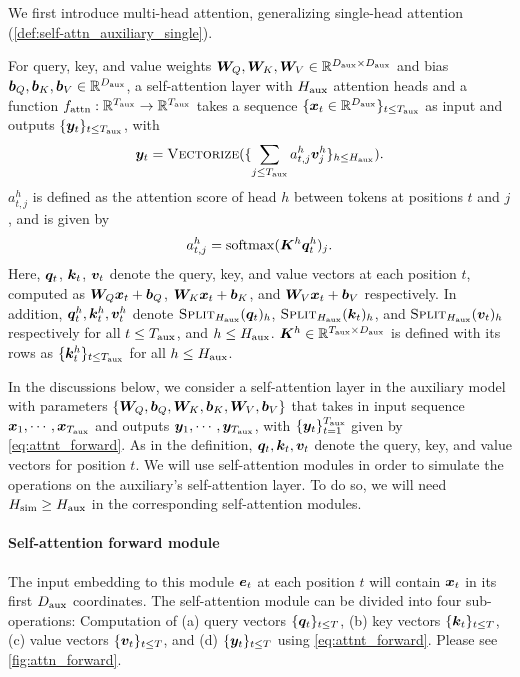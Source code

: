 We first introduce multi-head attention,  generalizing  single-head attention (\cref{def:self-attn_auxiliary_single}). 
\begin{definition}\label{def:self-attn}
    For query, key, and value weights ${\bm{W}}_Q, {\bm{W}}_K, {\bm{W}}_V \in\mathbb{R}^{D_{\text{aux}}\times D_{\text{aux}}}$ and bias ${\bm{b}}_{Q}, {\bm{b}}_{K}, {\bm{b}}_{V} \in\mathbb{R}^{D_{\text{aux}}}$, a self-attention layer with $H_{\text{aux}}$ attention heads and a function $f_{\mathrm{attn}}: \mathbb{R}^{T_{\text{aux}}} \to \mathbb{R}^{T_{\text{aux}}}$ takes a sequence $\{{\bm{x}}_t\in\mathbb{R}^{D_{\text{aux}}}\}_{t \le T_{\text{aux}}}$ as input and outputs $\{ {\bm{y}}_t \}_{t \le T_{\text{aux}}}$, with 
    \begin{align}
        {\bm{y}}_t = \textsc{Vectorize} ( \{ \sum_{j \le T_{\text{aux}}} a^h_{t, j}  {\bm{v}}^{h}_j  \}_{h \le H_{\text{aux}}} ).  \label{eq:attnt_forward}
    \end{align}
    $a^{h}_{t, j}$ is defined as the attention score of head $h$ between tokens at positions $t$ and $j$, and is given by
    \begin{align} \label{eq:attn}
        a^h_{t, j} =  \mathrm{softmax} ( {\bm{K}}^{h} {\bm{q}}^{h}_t )_j.
    \end{align}
     Here, ${\bm{q}}_t$, ${\bm{k}}_t$, ${\bm{v}}_t$ denote the query, key, and value vectors at each position $t$, computed as ${\bm{W}}_Q {\bm{x}}_t + {\bm{b}}_Q$, ${\bm{W}}_K {\bm{x}}_t + {\bm{b}}_K$, and ${\bm{W}}_V {\bm{x}}_t + {\bm{b}}_V$ respectively. In addition, ${\bm{q}}^{h}_t, {\bm{k}}^{h}_t, {\bm{v}}^{h}_t$ denote $\textsc{Split}_{H_{\text{aux}}} ({\bm{q}}_t)_h$, $\textsc{Split}_{H_{\text{aux}}} ({\bm{k}}_t)_h$, and $\textsc{Split}_{H_{\text{aux}}} ({\bm{v}}_t)_h$ respectively for all $t \le T_{\text{aux}}$, and $h \le H_{\text{aux}}$. 
     ${\bm{K}}^h \in \mathbb{R}^{T_{\text{aux}} \times D_{\text{aux}} }$ is defined with its rows as $\{{\bm{k}}^h_t\}_{t \le T_{\text{aux}}}$ for all $h \le H_{\text{aux}}$.
\end{definition}


In the discussions below, we consider a self-attention layer in the auxiliary model with parameters $\{{\bm{W}}_Q, {\bm{b}}_{Q}, {\bm{W}}_K, {\bm{b}}_K, {\bm{W}}_V, {\bm{b}}_{V}\}$ that takes in input sequence ${\bm{x}}_1, \cdots, {\bm{x}}_{T_{\text{aux}}}$ and outputs ${\bm{y}}_1, \cdots, {\bm{y}}_{T_{\text{aux}}}$, with $\{ {\bm{y}}_t \}_{t=1}^{T_{\text{aux}}}$ given by \eqref{eq:attnt_forward}. As in the definition,  ${\bm{q}}_t, {\bm{k}}_t, {\bm{v}}_t$ denote the query, key, and value vectors for position $t$. We will use \simulator{} self-attention modules in order to simulate the operations on the auxiliary's self-attention layer. To do so, we will need $H_{\text{sim}} \ge H_{\text{aux}}$ in the corresponding \simulator{} self-attention modules.



\paragraph{\simulator{} Self-attention forward module}
The input embedding to this  module $\ve_t$ at each position $t$ will contain ${\bm{x}}_t$ in its first $D_{\text{aux}}$ coordinates. The self-attention module can be divided into four sub-operations: Computation of (a)  query vectors $\{ {\bm{q}}_t \}_{t \le T}$, (b)  key vectors $\{ {\bm{k}}_t \}_{t \le T}$, (c)  value vectors $\{ {\bm{v}}_t \}_{t \le T}$, and (d)  $\{ {\bm{y}}_t \}_{t \le T}$ using \eqref{eq:attnt_forward}. Please see \cref{fig:attn_forward}.

